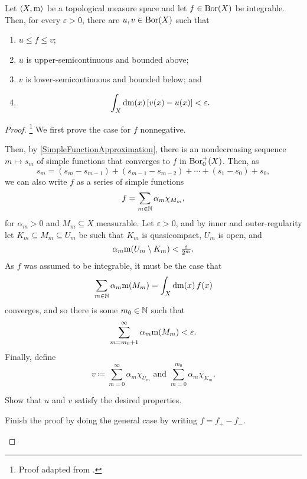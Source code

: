 \begin{thm}\label{CaratheodoryVitaliTheorem}
Let $\langle X,\mathrm{m}\rangle$ be a topological measure space and let $f\in \operatorname{Bor} (X)$ be integrable.  Then, for every $\varepsilon >0$, there are $u,v\in \operatorname{Bor} (X)$ such that
\begin{enumerate}
\item $u\leq f\leq v$;
\item $u$ is upper-semicontinuous and bounded above;
\item $v$ is lower-semicontinuous and bounded below; and
\item
\begin{equation}
\int _X\mathop{}\!\mathrm{d} \mathrm{m} (x)\, [v(x)-u(x)]<\varepsilon .
\end{equation}
\end{enumerate}
\begin{proof}\footnote{Proof adapted from \cite[pg.~56]{BigRudin}.}
We first prove the case for $f$ nonnegative.

Then, by \cref{SimpleFunctionApproximation}, there is an nondecreasing sequence $m\mapsto s_m$ of simple functions that converges to $f$ in $\operatorname{Bor} _0^+(X)$.  Then, as
\begin{equation}
s_m=(s_m-s_{m-1})+(s_{m-1}-s_{m-2})+\cdots +(s_1-s_0)+s_0,
\end{equation}
we can also write $f$ as a series of simple functions
\begin{equation}
f=\sum _{m\in \mathbb{N}}\alpha _m\chi _{M_m},
\end{equation}
for $\alpha _m>0$ and $M_m\subseteq X$ measurable.  Let $\varepsilon >0$, and by inner and outer-regularity let $K_m\subseteq M_m\subseteq U_m$ be such that $K_m$ is quasicompact, $U_m$ is open, and
\begin{equation}
\alpha _m\mathrm{m} (U_m\setminus K_m)<\tfrac{\varepsilon}{2^m}.
\end{equation}
As $f$ was assumed to be integrable, it must be the case that
\begin{equation}
\sum _{m\in \mathbb{N}}\alpha _m\mathrm{m} (M_m)=\int _X\mathop{}\!\mathrm{d} \mathrm{m} (x)\, f(x)
\end{equation}
converges, and so there is some $m_0\in \mathbb{N}$ such that
\begin{equation}
\sum _{m=m_0+1}^\infty \alpha _m\mathrm{m} (M_m)<\varepsilon .
\end{equation}
Finally, define
\begin{equation}
v\coloneqq \sum _{m=0}^\infty \alpha _m\chi _{U_m}\text{ and }\sum _{m=0}^{m_0}\alpha _m\chi _{K_m}.
\end{equation}
\begin{exr}
Show that $u$ and $v$ satisfy the desired properties.
\end{exr}
\begin{exr}
Finish the proof by doing the general case by writing $f=f_+-f_-$.
\end{exr}
\end{proof}
\end{thm}

